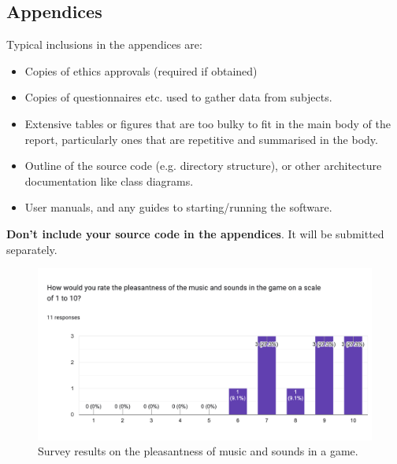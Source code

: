\documentclass{l4proj}
\begin{document}
\begin{appendices}

\chapter{Appendices}

Typical inclusions in the appendices are:

\begin{itemize}
\item
  Copies of ethics approvals (required if obtained)
\item
  Copies of questionnaires etc. used to gather data from subjects.
\item
  Extensive tables or figures that are too bulky to fit in the main body of
  the report, particularly ones that are repetitive and summarised in the body.

\item Outline of the source code (e.g. directory structure), or other architecture documentation like class diagrams.

\item User manuals, and any guides to starting/running the software.

\end{itemize}

\textbf{Don't include your source code in the appendices}. It will be
submitted separately.


\begin{figure}[h]
 \centering
 \includegraphics[width=0.7\linewidth]{dissertation/images/Pleasentness.png} 
 \caption{Survey results on the pleasantness of music and sounds in a game.} 
 \label{fig:pleasentness} 
\end{figure}


\end{appendices}






\end{document}
